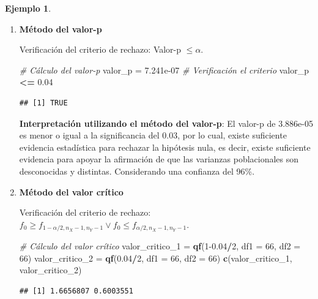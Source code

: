 \documentclass[
  11pt,
]{book}
\newenvironment{Shaded}{\begin{snugshade}}{\end{snugshade}}
\newcommand{\AttributeTok}[1]{\textcolor[rgb]{0.13,0.29,0.53}{#1}}
\newcommand{\CommentTok}[1]{\textcolor[rgb]{0.56,0.35,0.01}{\textit{#1}}}
\newcommand{\DecValTok}[1]{\textcolor[rgb]{0.00,0.00,0.81}{#1}}
\newcommand{\FloatTok}[1]{\textcolor[rgb]{0.00,0.00,0.81}{#1}}
\newcommand{\FunctionTok}[1]{\textcolor[rgb]{0.13,0.29,0.53}{\textbf{#1}}}
\newcommand{\NormalTok}[1]{#1}
\newcommand{\OtherTok}[1]{\textcolor[rgb]{0.56,0.35,0.01}{#1}}
\newcommand{\SpecialCharTok}[1]{\textcolor[rgb]{0.81,0.36,0.00}{\textbf{#1}}}
\theoremstyle{definition}
\theoremstyle{definition}
\newtheorem{example}{Ejemplo}[chapter]
\theoremstyle{definition}
\theoremstyle{definition}
\theoremstyle{remark}
\begin{document}
\begin{example}
\begin{enumerate}
\def\labelenumi{\arabic{enumi}.}
\item
  \textbf{Método del valor-p}

  Verificación del criterio de rechazo: Valor-p \(\leq \alpha\).

\begin{Shaded}
\begin{Highlighting}[]
\CommentTok{\# Cálculo del valor{-}p}
\NormalTok{valor\_p }\OtherTok{=} \FloatTok{7.241e{-}07}
\CommentTok{\# Verificación el criterio}
\NormalTok{valor\_p }\SpecialCharTok{\textless{}=} \FloatTok{0.04}
\end{Highlighting}
\end{Shaded}

\begin{verbatim}
## [1] TRUE
\end{verbatim}

  \textbf{Interpretación utilizando el método del valor-p}: El valor-p de 3.886e-05 es menor o igual a la significancia del 0.03, por lo cual, existe suficiente evidencia estadística para rechazar la hipótesis nula, es decir, existe suficiente evidencia para apoyar la afirmación de que las varianzas poblacionales son desconocidas y distintas. Considerando una confianza del 96\%.
\item
  \textbf{Método del valor crítico}

  Verificación del criterio de rechazo: \(f_0 \geq f_{1-\alpha/2,n_X-1,n_Y-1} \vee f_0 \leq f_{\alpha/2,n_X-1,n_Y-1}\).

\begin{Shaded}
\begin{Highlighting}[]
\CommentTok{\# Cálculo del valor crítico}
\NormalTok{valor\_critico\_1 }\OtherTok{=} \FunctionTok{qf}\NormalTok{(}\DecValTok{1}\FloatTok{{-}0.04}\SpecialCharTok{/}\DecValTok{2}\NormalTok{, }\AttributeTok{df1 =} \DecValTok{66}\NormalTok{, }\AttributeTok{df2 =} \DecValTok{66}\NormalTok{)}
\NormalTok{valor\_critico\_2 }\OtherTok{=} \FunctionTok{qf}\NormalTok{(}\FloatTok{0.04}\SpecialCharTok{/}\DecValTok{2}\NormalTok{, }\AttributeTok{df1 =} \DecValTok{66}\NormalTok{, }\AttributeTok{df2 =} \DecValTok{66}\NormalTok{)}
\FunctionTok{c}\NormalTok{(valor\_critico\_1, valor\_critico\_2)}
\end{Highlighting}
\end{Shaded}

\begin{verbatim}
## [1] 1.6656807 0.6003551
\end{verbatim}


\end{enumerate}
\end{example}
\end{document}

